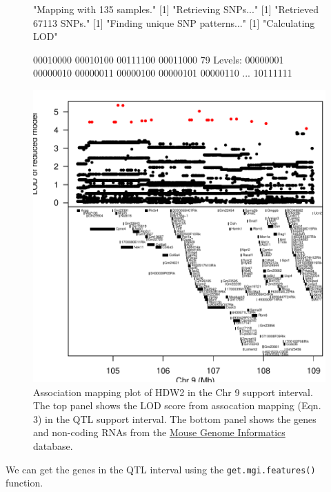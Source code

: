 \documentclass{article}
\begin{document}
\begin{figure}
\begin{center}
\begin{Schunk}
\begin{Soutput}
[1] "Mapping with 135 samples."
[1] "Retrieving SNPs..."
[1] "Retrieved 67113 SNPs."
[1] "Finding unique SNP patterns..."
[1] "Calculating LOD"
\end{Soutput}
\begin{Soutput}
[1] 00010000 00010100 00111100 00011000
79 Levels: 00000001 00000010 00000011 00000100 00000101 00000110 ... 10111111
\end{Soutput}
\end{Schunk}
\includegraphics{QTL_Mapping_DO_Mice-fig3}
\end{center}
\caption{Association mapping plot of HDW2 in the Chr 9 support interval. The top panel shows the LOD score from assocation mapping (Eqn. 3) in the QTL support interval. The bottom panel shows the genes and non-coding RNAs from the \href{http://informatics.jax.org/}{Mouse Genome Informatics} database.}
\label{fig:qtlplot}
\end{figure}

We can get the genes in the QTL interval using the \texttt{get.mgi.features()} function.
\end{document}
